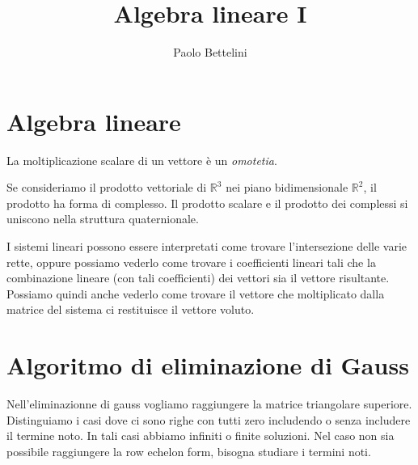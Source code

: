 \documentclass[a4paper]{article}
\title{Algebra lineare I}
\author{Paolo Bettelini}
\date{}
\begin{document}
\maketitle
\tableofcontents

\section{Algebra lineare}

La moltiplicazione scalare di un vettore è un \emph{omotetia}.

Se consideriamo il prodotto vettoriale di \(\mathbb{R}^3\)
nei piano bidimensionale \(\mathbb{R}^2\), il prodotto ha forma
di complesso. Il prodotto scalare e il prodotto dei complessi
si uniscono nella struttura quaternionale.

I sistemi lineari possono essere interpretati come trovare l'intersezione delle varie rette,
oppure possiamo vederlo come trovare i coefficienti lineari tali che la combinazione lineare
(con tali coefficienti) dei vettori sia il vettore risultante.
Possiamo quindi anche vederlo come trovare il vettore che moltiplicato dalla matrice del sistema
ci restituisce il vettore voluto.

\section{Algoritmo di eliminazione di Gauss}



Nell'eliminazionne di gauss vogliamo raggiungere la matrice triangolare superiore.
Distinguiamo i casi dove ci sono righe con tutti zero includendo o senza includere il termine noto.
In tali casi abbiamo infiniti o finite soluzioni.
Nel caso non sia possibile raggiungere la row echelon form, bisogna studiare i termini noti.
\end{document}
